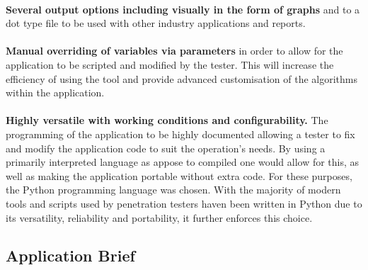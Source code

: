 \paragraph{}\textbf{Several output options including visually in the form of graphs} and to a dot type file to be used with other industry applications and reports.

\paragraph{}\textbf{Manual overriding of variables via parameters} in order to allow for the application to be scripted and modified by the tester. This will increase the efficiency of using the tool and provide advanced customisation of the algorithms within the application.

\paragraph{}\textbf{Highly versatile with working conditions and configurability.} The programming of the application to be highly documented allowing a tester to fix and modify the application code to suit the operation’s needs. By using a primarily interpreted language as appose to compiled one would allow for this, as well as making the application portable without extra code. For these purposes, the Python programming language was chosen. With the majority of modern tools and scripts used by penetration testers haven been written in Python due to its versatility, reliability and portability, it further enforces this choice.


\subsection{Application Brief}
\label{brief}
